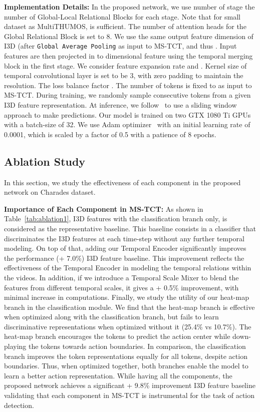 \documentclass[10pt,twocolumn,letterpaper]{article}
\begin{document}
\noindent\textbf{Implementation Details:} In the proposed network, we use number of stage  the number of Global-Local Relational Blocks  for each stage. Note that for small dataset as MultiTHUMOS,  is sufficient.
The number of attention heads for the Global Relational Block is set to 8. We use the same output feature dimension of I3D (after \texttt{Global Average Pooling} as input to MS-TCT, and thus . Input features are then projected in to  dimensional feature using the temporal merging block in the first stage. We consider feature expansion rate  and . Kernel size  of temporal convolutional layer is set to be 3, with zero padding to maintain the resolution. The loss balance factor . 
The number of tokens is fixed to  as input to MS-TCT. During training, we randomly sample consecutive  tokens from a given I3D feature representation. At inference, we follow~\cite{MLAD} to use a sliding window approach to make predictions. 
Our model is trained on two GTX 1080 Ti GPUs with a batch-size of 32. We use Adam optimizer~\cite{adam_optimizer} with an initial learning rate of 0.0001, which is scaled by a factor of 0.5 with a patience of 8 epochs.


\subsection{Ablation Study}
In this section, we study the effectiveness of each component in the proposed network on Charades dataset. 

\noindent \textbf{Importance of Each Component in MS-TCT:}
As shown in Table~\ref{tab:ablation1}, I3D features with the classification branch only, is considered as the representative baseline.
This baseline consists in a classifier that discriminates the I3D features at each time-step without any further temporal modeling.  
On top of that, adding our Temporal Encoder significantly improves the performance (+ 7.0\%) \wrt I3D feature baseline. This improvement reflects the effectiveness of the Temporal Encoder in modeling the temporal relations within the videos. 
In addition, if we introduce a Temporal Scale Mixer to blend the features from different temporal scales, it gives a + 0.5\% improvement, with minimal increase in computations. 
Finally, we study the utility of our heat-map branch in the classification module. We find that the heat-map branch is effective when optimized along with the classification branch, but fails to learn discriminative representations when optimized without it (25.4\% vs 10.7\%). The heat-map branch encourages the tokens to predict the action center while down-playing the tokens towards action boundaries. In comparison, the classification branch improves the token representations equally for all tokens, despite action boundaries. Thus, when optimized together, both branches enable the model to learn a better action representation.
While having all the components, the proposed network achieves a significant + 9.8\% improvement \wrt I3D feature baseline validating that each component in MS-TCT is instrumental for the task of action detection.
\end{document}
